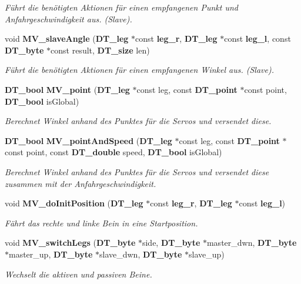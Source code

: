 \begin{DoxyCompactItemize}
\begin{DoxyCompactList}\small\item\em Führt die benötigten Aktionen für einen empfangenen Punkt und Anfahrgeschwindigkeit aus. (Slave). \item\end{DoxyCompactList}\item 
void {\bf MV\_\-slaveAngle} ({\bf DT\_\-leg} $\ast$const {\bf leg\_\-r}, {\bf DT\_\-leg} $\ast$const {\bf leg\_\-l}, const {\bf DT\_\-byte} $\ast$const result, {\bf DT\_\-size} len)
\begin{DoxyCompactList}\small\item\em Führt die benötigten Aktionen für einen empfangenen Winkel aus. (Slave). \item\end{DoxyCompactList}\item 
{\bf DT\_\-bool} {\bf MV\_\-point} ({\bf DT\_\-leg} $\ast$const leg, const {\bf DT\_\-point} $\ast$const point, {\bf DT\_\-bool} isGlobal)
\begin{DoxyCompactList}\small\item\em Berechnet Winkel anhand des Punktes für die Servos und versendet diese. \item\end{DoxyCompactList}\item 
{\bf DT\_\-bool} {\bf MV\_\-pointAndSpeed} ({\bf DT\_\-leg} $\ast$const leg, const {\bf DT\_\-point} $\ast$const point, const {\bf DT\_\-double} speed, {\bf DT\_\-bool} isGlobal)
\begin{DoxyCompactList}\small\item\em Berechnet Winkel anhand des Punktes für die Servos und versendet diese zusammen mit der Anfahrgeschwindigkeit. \item\end{DoxyCompactList}\item 
void {\bf MV\_\-doInitPosition} ({\bf DT\_\-leg} $\ast$const {\bf leg\_\-r}, {\bf DT\_\-leg} $\ast$const {\bf leg\_\-l})
\begin{DoxyCompactList}\small\item\em Fährt das rechte und linke Bein in eine Startposition. \item\end{DoxyCompactList}\item 
void {\bf MV\_\-switchLegs} ({\bf DT\_\-byte} $\ast$side, {\bf DT\_\-byte} $\ast$master\_\-dwn, {\bf DT\_\-byte} $\ast$master\_\-up, {\bf DT\_\-byte} $\ast$slave\_\-dwn, {\bf DT\_\-byte} $\ast$slave\_\-up)
\begin{DoxyCompactList}\small\item\em Wechselt die aktiven und passiven Beine. \item\end{DoxyCompactList}\item 

\end{DoxyCompactItemize}
